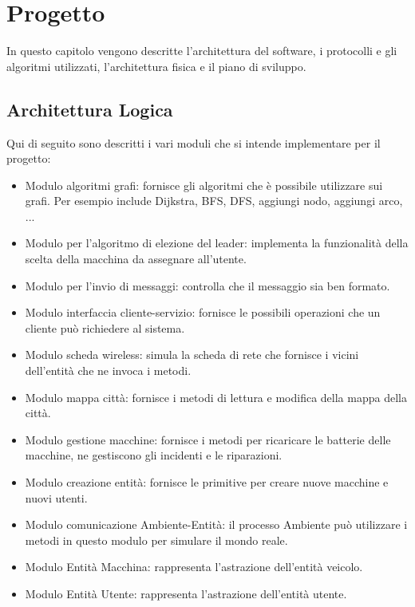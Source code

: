 
\chapter{Progetto} \label{progetto}

In questo capitolo vengono descritte l'architettura del software, i protocolli e gli algoritmi utilizzati, l'architettura fisica e il piano di sviluppo.

\section{Architettura Logica}

Qui di seguito sono descritti i vari moduli che si intende implementare per il progetto:
\begin{itemize}
	\item Modulo algoritmi grafi: fornisce gli algoritmi che è possibile utilizzare sui grafi. Per esempio include Dijkstra, BFS, DFS, aggiungi nodo, aggiungi arco, ... 
	
	\item Modulo per l'algoritmo di elezione del leader: implementa la funzionalità della scelta della macchina da assegnare all'utente.
	
	\item Modulo per l'invio di messaggi: controlla che il messaggio sia ben formato.
	
	\item Modulo interfaccia cliente-servizio: fornisce le possibili operazioni che un cliente può richiedere al sistema.
	
	\item Modulo scheda wireless: simula la scheda di rete che fornisce i vicini dell'entità che ne invoca i metodi.
	
	\item Modulo mappa città: fornisce i metodi di lettura e modifica della mappa della città.
	
	\item Modulo gestione macchine: fornisce i metodi per ricaricare le batterie delle macchine, ne gestiscono gli incidenti e le riparazioni.
	
	\item Modulo creazione entità: fornisce le primitive per creare nuove macchine e nuovi utenti.
	
	\item Modulo comunicazione Ambiente-Entità: il processo Ambiente può utilizzare i metodi in questo modulo per simulare il mondo reale.
	
	\item Modulo Entità Macchina: rappresenta l'astrazione dell'entità veicolo.
	
	\item Modulo Entità Utente: rappresenta l'astrazione dell'entità utente.

\end{itemize}

